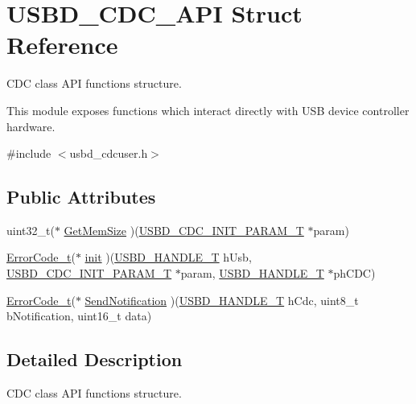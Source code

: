 \hypertarget{struct_u_s_b_d___c_d_c___a_p_i}{}\section{U\+S\+B\+D\+\_\+\+C\+D\+C\+\_\+\+A\+PI Struct Reference}
\label{struct_u_s_b_d___c_d_c___a_p_i}


C\+DC class A\+PI functions structure.

This module exposes functions which interact directly with U\+SB device controller hardware.  




{\ttfamily \#include $<$usbd\+\_\+cdcuser.\+h$>$}

\subsection*{Public Attributes}
\begin{DoxyCompactItemize}
\item 
uint32\+\_\+t($\ast$ \hyperlink{struct_u_s_b_d___c_d_c___a_p_i_abde21c25f0b02b4d3ec9af0e41378437}{Get\+Mem\+Size} )(\hyperlink{group___u_s_b_d___c_d_c_ga78b2c5f20653181161c59062795233b3}{U\+S\+B\+D\+\_\+\+C\+D\+C\+\_\+\+I\+N\+I\+T\+\_\+\+P\+A\+R\+A\+M\+\_\+T} $\ast$param)
\item 
\hyperlink{error_8h_a905255056c349318139d94aa4523d516}{Error\+Code\+\_\+t}($\ast$ \hyperlink{struct_u_s_b_d___c_d_c___a_p_i_a3c3f8725643c607bca1cf3f422dc5702}{init} )(\hyperlink{group___u_s_b_d___core_gafdbb2204d929cb9d75736bd2b42342ac}{U\+S\+B\+D\+\_\+\+H\+A\+N\+D\+L\+E\+\_\+T} h\+Usb, \hyperlink{group___u_s_b_d___c_d_c_ga78b2c5f20653181161c59062795233b3}{U\+S\+B\+D\+\_\+\+C\+D\+C\+\_\+\+I\+N\+I\+T\+\_\+\+P\+A\+R\+A\+M\+\_\+T} $\ast$param, \hyperlink{group___u_s_b_d___core_gafdbb2204d929cb9d75736bd2b42342ac}{U\+S\+B\+D\+\_\+\+H\+A\+N\+D\+L\+E\+\_\+T} $\ast$ph\+C\+DC)
\item 
\hyperlink{error_8h_a905255056c349318139d94aa4523d516}{Error\+Code\+\_\+t}($\ast$ \hyperlink{struct_u_s_b_d___c_d_c___a_p_i_a39f1af8073c7e98a7a96ac68e612e7fe}{Send\+Notification} )(\hyperlink{group___u_s_b_d___core_gafdbb2204d929cb9d75736bd2b42342ac}{U\+S\+B\+D\+\_\+\+H\+A\+N\+D\+L\+E\+\_\+T} h\+Cdc, uint8\+\_\+t b\+Notification, uint16\+\_\+t data)
\end{DoxyCompactItemize}


\subsection{Detailed Description}
C\+DC class A\+PI functions structure.

